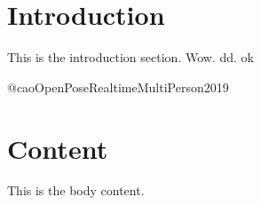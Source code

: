 \section{Introduction}
This is the introduction section. Wow. dd. ok 

@caoOpenPoseRealtimeMultiPerson2019
\section{Content}
This is the body content.